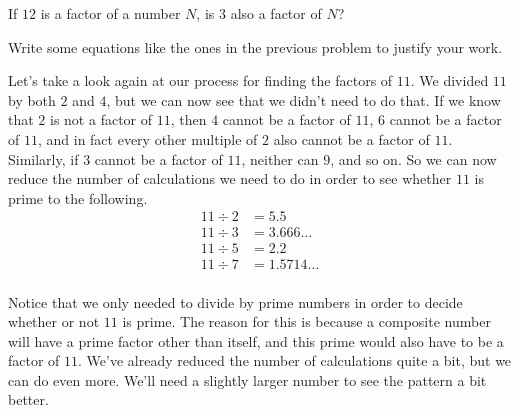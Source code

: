 \documentclass{ximera}
\begin{document}
\begin{question}
If $12$ is a factor of a number $N$, is $3$ also a factor of $N$?
\begin{multipleChoice}
\begin{feedback}
Write some equations like the ones in the previous problem to justify your work.
\end{feedback}
\end{multipleChoice}
\end{question}

Let's take a look again at our process for finding the factors of $11$. We divided $11$ by both $2$ and $4$, but we can now see that we didn't need to do that. If we know that $2$ is not a factor of $11$, then $4$ cannot be a factor of $11$, $6$ cannot be a factor of $11$, and in fact every other multiple of $2$ also cannot be a factor of $11$. Similarly, if $3$ cannot be a factor of $11$, neither can $9$, and so on. So we can now reduce the number of calculations we need to do in order to see whether $11$ is prime to the following. 
\begin{align*}
11 \div 2 &= 5.5 \\
11 \div 3 &= 3.666\dots \\
11 \div 5 &= 2.2 \\
11 \div 7 &= 1.5714\dots \\
\end{align*}

Notice that we only needed to divide by prime numbers in order to decide whether or not $11$ is prime. The reason for this is because a composite number will have a prime factor other than itself, and this prime would also have to be a factor of $11$. We've already reduced the number of calculations quite a bit, but we can do even more. We'll need a slightly larger number to see the pattern a bit better.
\end{document}
